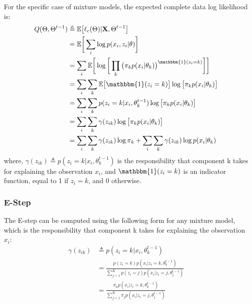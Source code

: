 For the specific case of mixture models, the expected complete data log likelihood is:
\begin{equation} \label{log-lik-expected-derivation-f-mm}
	\begin{aligned}
		Q(\Theta, \Theta^{t-1}) & \triangleq \mathbb{E} \big[\ell_{c}(\Theta) | \mathbf{X}, \Theta^{t-1}\big] \\
								& = \mathbb{E} \bigg[ \sum_{i} \log p(x_{i}, z_{i}|\theta) \bigg] \\
								& = \sum_{i} \mathbb{E} \bigg[ \log \bigg[\prod_{k} \big( \pi_{k}p(x_{i}|\theta_{k})\big)^{\mathbbm{1}(z_{i}=k)} \bigg]\bigg] \\
								& = \sum_{i} \sum_{k} \mathbb{E} \big[\mathbbm{1}(z_{i}=k)\big] \log \big[\pi_{k}p(x_{i}|\theta_{k})\big] \\
								& = \sum_{i} \sum_{k} p(z_{i}=k|x_{i},\theta_{k}^{t-1}) \log \big[\pi_{k}p(x_{i}|\theta_{k})\big] \\
								& = \sum_{i} \sum_{k} \gamma(z_{ik}) \log \big[\pi_{k}p(x_{i}|\theta_{k})\big] \\
								& = \sum_{i} \sum_{k} \gamma(z_{ik}) \log \pi_{k} + \sum_{i} \sum_{k} \gamma(z_{ik}) \log p(x_{i}|\theta_{k}) \\		
	\end{aligned}
\end{equation}
where, $\gamma(z_{ik}) \triangleq p(z_{i}=k|x_{i},\theta_{k}^{t-1})$ is the responsibility that component k takes for explaining the observation $x_{i}$, and $\mathbbm{1}(z_{i}=k)$ is an indicator function, equal to 1 if $z_{i}=k$, and 0 otherwise.


\subsubsection{E-Step}
The E-step can be computed using the following form for any mixture model, which is the responsibility that component k takes for explaining the observation $x_{i}$:
\begin{equation} \label{responsibilities-f-mm}
  \begin{aligned}
	\gamma(z_{ik}) & \triangleq p(z_{i}=k|x_{i},\theta_{k}^{t-1}) \\
				   & = \frac{p(z_{i}=k)p(x_{i}|z_{i}=k,\theta_{k}^{t-1})}{\sum\limits_{j=1}^{K} p(z_{i}=j)p(x_{i}|z_{i}=j,\theta_{j}^{t-1})} \\
				   & = \frac{\pi_{k}p(x_{i}|z_{i}=k,\theta_{k}^{t-1})}{\sum\limits_{j=1}^{K} \pi_{j}p(x_{i}|z_{i}=j,\theta_{j}^{t-1})}
  \end{aligned}
\end{equation}


